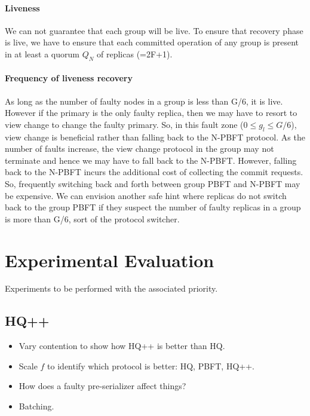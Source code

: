 \documentclass[twocolumn,10pt]{article}
\begin{document}
\paragraph{Liveness} We can not guarantee that each group will be live. To ensure that recovery phase is live, we have to ensure that each committed operation of any group
is present in at least a quorum $Q_N$ of replicas (=2F+1). 

\paragraph{Frequency of liveness recovery} As long as the number of faulty nodes in a group is less than G/6, it is live. 
However if the primary is the only faulty replica, then we may have to resort to view change to change the faulty primary.
So, in this fault zone ($0 \le g_l \le G/6$), view change
is beneficial rather than falling back to the N-PBFT protocol. As the number of faults increase, the view change protocol in the group
may not terminate and hence we may have to fall back to the N-PBFT. However, falling back to the N-PBFT incurs the additional cost of 
collecting the commit requests. So, frequently switching back and forth between group PBFT and N-PBFT may be expensive. We can
envision another safe hint where replicas do not switch back to the group PBFT if they suspect the number of faulty replicas in a group is
more than G/6, sort of the protocol switcher.

\section{Experimental Evaluation}
Experiments to be performed with the associated priority.

\subsection{HQ++}

\begin{itemize}
\item{}Vary contention to show how HQ++ is better than HQ. 

\item{}Scale $f$ to identify which protocol is better: HQ, PBFT, HQ++. 

\item{} How does a faulty pre-serializer affect things?  
\item{} Batching. 
\end{itemize}
\end{document}
